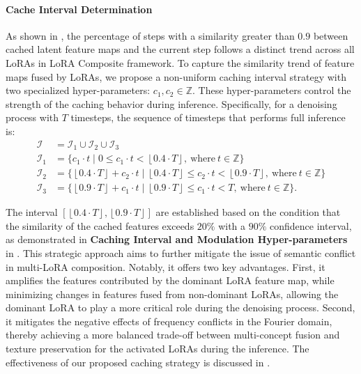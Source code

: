 \paragraph{Cache Interval Determination}
As shown in , the percentage of steps with a similarity greater than $0.9$ between cached latent feature maps and the current step follows a distinct trend across all LoRAs in LoRA Composite framework. To capture the similarity trend of feature maps fused by LoRAs, we propose a non-uniform caching interval strategy with two specialized hyper-parameters: $c_{1}, c_{2}\in\mathbb{Z}$. These hyper-parameters control the strength of the caching behavior during inference. Specifically, for a denoising process with $T$ timesteps, the sequence of timesteps that performs full inference is:
\vspace{0pt}
\begin{equation}
\begin{aligned}
    \label{cache interval2}
    \mathcal{I} &= \mathcal{I}_{1} \cup \mathcal{I}_{2} \cup \mathcal{I}_{3} \\
    \mathcal{I}_{1} &= \{c_{1}\cdot t \mid 0 \leq c_{1}\cdot t < \left\lfloor 0.4 \cdot T \right\rfloor, \ \text{where} \ t \in \mathbb{Z}\} \\
    \mathcal{I}_{2} &= \{\left\lfloor 0.4 \cdot T \right\rfloor + c_{2}\cdot t \mid \left\lfloor 0.4 \cdot T \right\rfloor \leq c_{2}\cdot t < \left\lfloor 0.9 \cdot T \right\rfloor, \ \text{where} \ t \in \mathbb{Z}\} \\
    \mathcal{I}_{3} &= \{\left\lfloor 0.9 \cdot T \right\rfloor + c_{1}\cdot t \mid \left\lfloor 0.9 \cdot T \right\rfloor \leq c_{1}\cdot t < T, \ \text{where} \ t \in \mathbb{Z}\}.
\end{aligned}
\end{equation}

The interval $[\left\lfloor 0.4 \cdot T \right\rfloor, \left\lfloor 0.9 \cdot T \right\rfloor]$ are established based on the condition that the similarity of the cached features exceeds $20\%$ with a $90\%$ confidence interval, as demonstrated in \textbf{Caching Interval and Modulation Hyper-parameters} in . This strategic approach aims to further mitigate the issue of semantic conflict in multi-LoRA composition. Notably, it offers two key advantages. First, it amplifies the features contributed by the dominant LoRA feature map, while minimizing changes in features fused from non-dominant LoRAs, allowing the dominant LoRA to play a more critical role during the denoising process. Second, it mitigates the negative effects of frequency conflicts in the Fourier domain, thereby achieving a more balanced trade-off between multi-concept fusion and texture preservation for the activated LoRAs during the inference. The effectiveness of our proposed caching strategy is discussed in .

